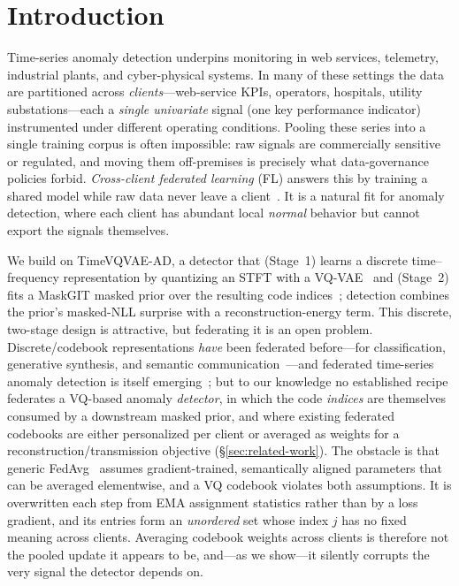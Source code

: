 \documentclass[11pt]{article}
\theoremstyle{plain}
\theoremstyle{definition}
\begin{document}
\begin{abstract}
We are explicit about what is and is not established: the sufficient-statistic primitive's
advantage, and whether federation reaches local/centralized parity, are \emph{open}
questions resolved only by the pre-registered converged experiment; the calibration,
mechanism, and heterogeneity findings above are the current, real-data contributions.
\end{abstract}

\section{Introduction}
\label{sec:fed-intro}

Time-series anomaly detection underpins monitoring in web services, telemetry,
industrial plants, and cyber-physical systems. In many of these settings the data are
partitioned across \emph{clients}---web-service KPIs, operators, hospitals, utility
substations---each a \emph{single univariate} signal (one key performance indicator)
instrumented under different operating conditions.
Pooling these series into a single training corpus is often impossible: raw signals
are commercially sensitive or regulated, and moving them off-premises is precisely
what data-governance policies forbid. \emph{Cross-client federated learning} (FL)
answers this by training a shared model while raw data never leave a
client~\cite{mcmahan2017fedavg,kairouz2021advances}. It is a natural fit for anomaly
detection, where each client has abundant local \emph{normal} behavior but cannot
export the signals themselves.

We build on TimeVQVAE-AD, a detector that (Stage~1) learns a
discrete time--frequency representation by quantizing an STFT with a
VQ-VAE~\cite{van_den_oord2017neural,lee2023timevqvae,lee2024timevqvaead} and
(Stage~2) fits a MaskGIT masked prior over the resulting code
indices~\cite{chang2022maskgit}; detection combines the prior's masked-NLL surprise
with a reconstruction-energy term. This discrete, two-stage design is attractive, but
federating it is an open problem. Discrete/codebook representations \emph{have} been federated
before---for classification, generative synthesis, and semantic
communication~\cite{zhang2024uefl,jiang2026synthfed,park2022fcdeepsc,jin2025svqvae}---and
federated time-series anomaly detection is itself emerging~\cite{perales2023temporalfed};
but to our knowledge no established recipe federates a VQ-based anomaly
\emph{detector}, in which the code \emph{indices} are themselves consumed by a
downstream masked prior, and where existing federated codebooks are either
personalized per client or averaged as weights for a reconstruction/transmission
objective (\S\ref{sec:related-work}). The obstacle is that generic
FedAvg~\cite{mcmahan2017fedavg} assumes gradient-trained, semantically aligned
parameters that can be averaged elementwise, and a VQ codebook violates both
assumptions. It is overwritten each step from EMA
assignment statistics rather than by a loss gradient, and its entries form an
\emph{unordered} set whose index $j$ has no fixed meaning across clients. Averaging
codebook weights across clients is therefore not the pooled update it appears to be,
and---as we show---it silently corrupts the very signal the detector depends on.
\end{document}
